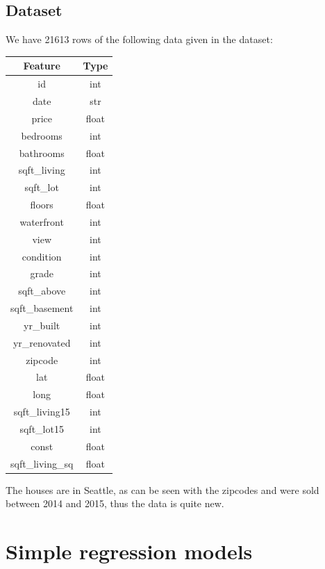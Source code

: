 \documentclass[12pt]{scrreprt}
\begin{document}
\section{Dataset}
\label{sec:data}

We have 21613 rows of the following data given in the dataset: 

\begin{center}
  \begin{tabular}{| c | c |}
    \hline
    \textbf{Feature} & \textbf{Type}\\
    \hline
    \hline
    id & int \\ \hline
    date & str \\ \hline
    price & float \\ \hline
    bedrooms & int \\ \hline
    bathrooms & float \\ \hline
    sqft\_living & int \\ \hline
    sqft\_lot & int \\ \hline
    floors & float \\ \hline
    waterfront & int \\ \hline
    view & int \\ \hline
    condition & int \\ \hline
    grade & int \\ \hline
    sqft\_above & int \\ \hline
    sqft\_basement & int \\ \hline
    yr\_built & int \\ \hline
    yr\_renovated & int \\ \hline
    zipcode & int \\ \hline
    lat & float \\ \hline
    long & float \\ \hline
    sqft\_living15 & int \\ \hline
    sqft\_lot15 & int \\ \hline
    const & float \\ \hline
    sqft\_living\_sq & float \\ \hline
  \end{tabular}
\end{center}

The houses are in Seattle, as can be seen with the zipcodes and were sold between 2014 and 2015, thus the data is quite new.\\


\chapter{Simple regression models} 
\label{chpt:srm}
\end{document}
